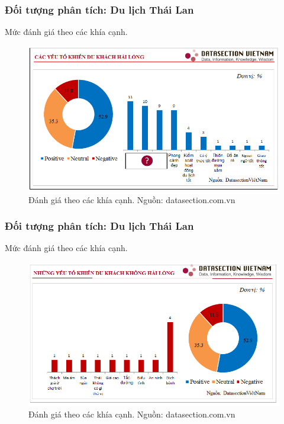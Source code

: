 \documentclass{beamer}
\begin{document}
\begin{frame}
\frametitle{Đối tượng phân tích: Du lịch Thái Lan}
Mức đánh giá theo các khía cạnh.
\begin{center}
\begin{figure}
\includegraphics[scale=0.45]{Image/thailan4.png}
\caption*{Đánh giá theo các khía cạnh. Nguồn: datasection.com.vn}
\label{labels:1}
\end{figure}
\end{center}
\end{frame}

\begin{frame}
\frametitle{Đối tượng phân tích: Du lịch Thái Lan}
Mức đánh giá theo các khía cạnh.
\begin{center}
\begin{figure}
\includegraphics[scale=0.45]{Image/thailan.png}
\caption*{Đánh giá theo các khía cạnh. Nguồn: datasection.com.vn}
\label{labels:1}
\end{figure}
\end{center}
\end{frame}
\end{document}

